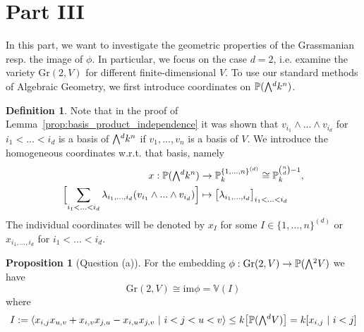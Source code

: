 \documentclass{scrartcl}
\newcommand{\V}{\mathbb{V}}
\newcommand{\Proj}{\mathbb{P}}
\newcommand{\Gr}{\mathrm{Gr}}
\newcommand{\extpow}{\mathchoice{{\textstyle\bigwedge}}
    {{\bigwedge}}
    {{\textstyle\wedge}}
    {{\scriptstyle\wedge}}}
\theoremstyle{definition}
\newtheorem{definition}[subsection]{Definition}
\newtheorem{proposition}[subsection]{Proposition}
\begin{document}
\section{Part III}
In this part, we want to investigate the geometric properties of the Grassmanian resp. the image of $\phi$.
In particular, we focus on the case $d = 2$, i.e. examine the variety $\Gr(2, V)$ for different finite-dimensional $V$.
To use our standard methods of Algebraic Geometry, we first introduce coordinates on $\Proj(\extpow^d k^n)$.
\begin{definition}
    Note that in the proof of Lemma~\ref{prop:basis_product_independence} it was shown that $v_{i_1} \wedge ... \wedge v_{i_d}$ for $i_1 < ... < i_d$ is a basis of $\extpow^d k^n$ if $v_1, ..., v_n$ is a basis of $V$.
    We introduce the homogeneous coordinates w.r.t. that basis, namely
    \begin{align*}
        x: \Proj(\extpow^d k^n) &\to \Proj_k^{\{1, ..., n\}^{(d)}} \cong \Proj_k^{{n \choose d} - 1}, \\
        \Bigl[ \sum_{i_1 < ... < i_d} \lambda_{i_1, ..., i_d} (v_{i_1} \wedge ... \wedge v_{i_d}) \Bigr] &\mapsto \bigl[ \lambda_{i_1, ..., i_d} \bigr]_{i_1 < ... < i_d}
    \end{align*}
    The individual coordinates will be denoted by $x_I$ for some $I \in \{1, ..., n\}^{(d)}$ or $x_{i_1, ..., i_d}$ for $i_1 < ... < i_d$.
\end{definition}
\begin{proposition}[Question (a)]
    \label{prop:equations_grassmanian_2}
    For the embedding $\phi: \Gr(2, V) \to \Proj(\extpow^2 V)$ we have
    \begin{equation*}
        \Gr(2, V) \cong \mathrm{im}\phi = \V(I)
    \end{equation*}
    where
    \begin{equation*}
        I := \langle x_{i, j}x_{u, v} + x_{i, v}x_{j, u} - x_{i, u}x_{j, v} \ | \ i < j < u < v \rangle \leq k\bigl[\Proj(\extpow^d V)\bigr] = k[x_{i, j} \ | \ i < j]
    \end{equation*}
\end{proposition}
\end{document}

